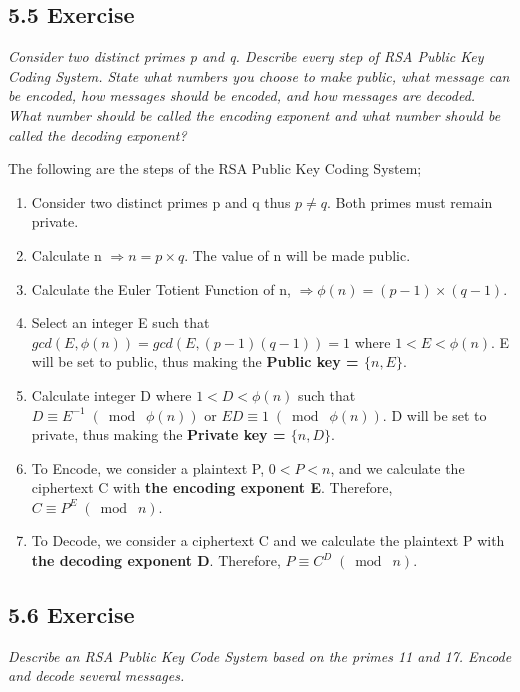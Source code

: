 \documentclass{article}
\begin{document}
\subsection*{5.5 Exercise} 
\quad \textit{Consider two distinct primes p and q. Describe every step of RSA Public Key Coding System. State what numbers you choose to make public, what message can be encoded, how messages should be encoded, and how messages are decoded. What number should be called the encoding exponent and what number should be called the decoding exponent?}

The following are the steps of the RSA Public Key Coding System;
\begin{enumerate}
    \item Consider two distinct primes p and q thus $p \neq q$. Both primes must remain private.
    \item Calculate n $\Longrightarrow n = p \times q$. The value of n will be made public.
    \item Calculate the Euler Totient Function of n, $\Longrightarrow \phi(n) = (p-1) \times (q-1)$.
    \item Select an integer E such that $gcd(E, \phi(n)) = gcd(E, (p-1)(q-1)) = 1$ where $1 < E < \phi(n)$. E will be set to public, thus making the \textbf{Public key = $\{n, E\}$}.
    \item Calculate integer D where $1 < D < \phi(n)$ such that $D \equiv E^{-1} \;(\bmod\; \phi(n))$ or $ED \equiv 1 \;(\bmod\; \phi(n))$. D will be set to private, thus making the \textbf{Private key = $\{n, D\}$}.
    \item To Encode, we consider a plaintext P, $0 < P <n$, and we calculate the ciphertext C with \textbf{the encoding exponent E}. Therefore, $C \equiv P^{E} \;(\bmod\; n)$.
    \item To Decode, we consider a ciphertext C and we calculate the plaintext P with \textbf{the decoding exponent D}. Therefore, $P \equiv C^{D} \;(\bmod\; n)$.
\end{enumerate}

\subsection*{5.6 Exercise} 
\quad \textit{Describe an RSA Public Key Code System based on the primes 11 and 17. Encode and decode several messages.}
\end{document}
